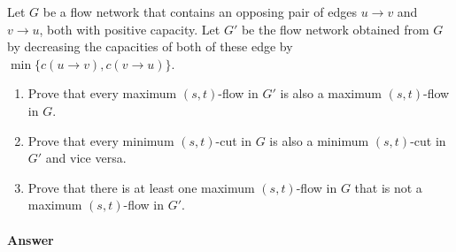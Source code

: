 \documentclass{article}
\begin{document}
Let $G$ be a flow network that contains an opposing pair of edges $u \to v$ and $v \to u$, both with positive capacity.
Let $G'$ be the flow network obtained from $G$ by decreasing the capacities of both of these edge by $\min \{ c(u \to v), c(v \to u) \}$.

\begin{enumerate}[label=(\alph*)]
    \item Prove that every maximum $(s,t)$-flow in $G'$ is also a maximum $(s,t)$-flow in $G$.
    \item Prove that every minimum $(s,t)$-cut in $G$ is also a minimum $(s,t)$-cut in $G'$ and vice versa.
    \item Prove that there is at least one maximum $(s,t)$-flow in $G$ that is not a maximum $(s,t)$-flow in $G'$.
\end{enumerate}

\paragraph{Answer}

\end{document}
